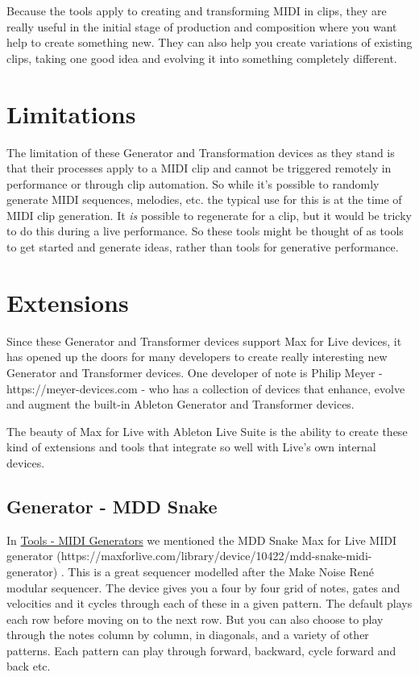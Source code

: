 \documentclass[
  12pt,
  letterpaper,
  oneside,
  open=any]{scrbook}
\begin{document}
Because the tools apply to creating and transforming MIDI in clips, they
are really useful in the initial stage of production and composition
where you want help to create something new. They can also help you
create variations of existing clips, taking one good idea and evolving
it into something completely different.

\section{Limitations}\label{limitations}

The limitation of these Generator and Transformation devices as they
stand is that their processes apply to a MIDI clip and cannot be
triggered remotely in performance or through clip automation. So while
it's possible to randomly generate MIDI sequences, melodies, etc. the
typical use for this is at the time of MIDI clip generation. It
\emph{is} possible to regenerate for a clip, but it would be tricky to
do this during a live performance. So these tools might be thought of as
tools to get started and generate ideas, rather than tools for
generative performance.

\section{Extensions}\label{extensions}

Since these Generator and Transformer devices support Max for Live
devices, it has opened up the doors for many developers to create really
interesting new Generator and Transformer devices. One developer of note
is Philip Meyer - https://meyer-devices.com - who has a collection of
devices that enhance, evolve and augment the built-in Ableton Generator
and Transformer devices.

The beauty of Max for Live with Ableton Live Suite is the ability to
create these kind of extensions and tools that integrate so well with
Live's own internal devices.

\subsection{Generator - MDD Snake}\label{generator---mdd-snake}

In \hyperref[Chapter-012-Tools-MIDI_Generators]{Tools - MIDI Generators}
we mentioned the MDD Snake Max for Live MIDI generator
(https://maxforlive.com/library/device/10422/mdd-snake-midi-generator) .
This is a great sequencer modelled after the Make Noise René modular
sequencer. The device gives you a four by four grid of notes, gates and
velocities and it cycles through each of these in a given pattern. The
default plays each row before moving on to the next row. But you can
also choose to play through the notes column by column, in diagonals,
and a variety of other patterns. Each pattern can play through forward,
backward, cycle forward and back etc.
\end{document}
